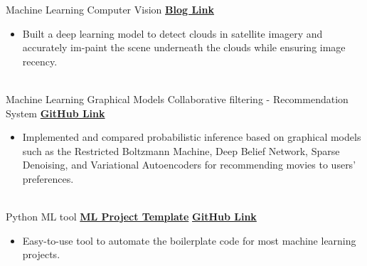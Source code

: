 \documentclass[letterpaper]{DS_class_file} %
\begin{document}
\begin{twenty} %
    
	\twentyitem
	{Machine Learning}
	{Computer Vision}
	{\hspace{0.3cm}{Cloud detection and removal in RGB satellite data}}
	{\href{https://eng.ruumi.io/post/seeing-through-clouds.html}{\textbf{Blog Link}}}
	{}
	{
		{\begin{itemize}
				\item Built a deep learning model to detect clouds in satellite imagery and accurately im-paint the scene underneath the clouds while ensuring image recency.
		\end{itemize}}
	}
	\\
	
	\twentyitem
	{Machine Learning}
	{Graphical Models}
	{\hspace{0.3cm}Collaborative filtering - Recommendation System}
	{\href{https://github.com/sowmyay/Collaborative-filtering-on-MovieLens}{\textbf{GitHub Link}}}
	{}
	{
		{\begin{itemize}
				\item Implemented and compared probabilistic inference based on graphical models such as the Restricted Boltzmann Machine, Deep Belief Network, Sparse Denoising, and Variational Autoencoders for recommending movies to users' preferences.
		\end{itemize}}
	}
	\\

    \twentyitem
	{Python}
	{ML tool}
	{\hspace{0.3cm}\href{https://pypi.org/project/mltemplate/}{\textbf{ML Project Template}}}
	{\href{https://github.com/sowmyay/ml-project-template/}{\textbf{GitHub Link}}}
	{}
	{
		{\begin{itemize}
				\item Easy-to-use tool to automate the boilerplate code for most machine learning projects.
		\end{itemize}}
	}
	\\
    

\end{twenty}
\end{document}
